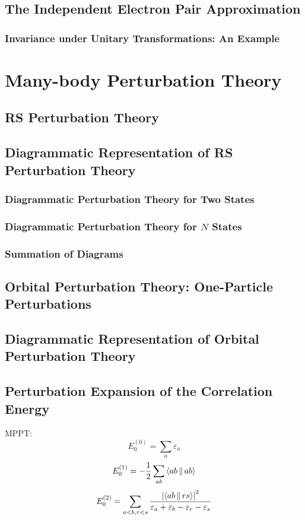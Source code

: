 \documentclass[a4paper]{article}
\numberwithin{equation}{section}
\begin{document}
\subsection{The Independent Electron Pair Approximation}
\subsubsection{Invariance under Unitary Transformations: An Example}

\section{Many-body Perturbation Theory}
\subsection{RS Perturbation Theory}

\subsection{Diagrammatic Representation of RS Perturbation Theory}
\subsubsection{Diagrammatic Perturbation Theory for Two States}
\subsubsection{Diagrammatic Perturbation Theory for $ N $ States}
\subsubsection{Summation of Diagrams}

\subsection{Orbital Perturbation Theory: One-Particle Perturbations}

\subsection{Diagrammatic Representation of Orbital Perturbation Theory}

\subsection{Perturbation Expansion of the Correlation Energy}
MPPT:
\begin{equation}\label{key}
E_0^{(0)} = \sum_a \varepsilon_a
\end{equation}
\begin{equation}\label{key}
E_0^{(1)} = -\dfrac{1}{2}\sum_{ab} \Braket{ab||ab}
\end{equation}
\begin{align}
E_0^{(2)} = %
\sum_{a<b,r<s} \dfrac{\abs{\Braket{ab||rs}}^2}{\varepsilon_a + \varepsilon_b - \varepsilon_r - \varepsilon_s}
\end{align}
\end{document}
